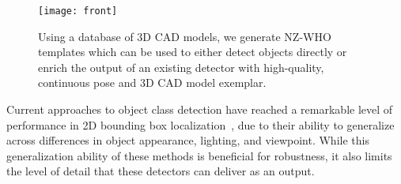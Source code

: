 \begin{figure}[t]
  \centering
  \texttt{[image: front]} %
  \caption{Using a database of 3D CAD models, we generate NZ-WHO
    templates which can be used to either detect objects directly or
    enrich the output of an existing detector with high-quality,
    continuous pose and 3D CAD model exemplar.}
  \label{fig:front}
\end{figure}
 

Current approaches to object class detection have reached a remarkable
level of performance in 2D bounding box
localization~\cite{pascal12, Felzenszwalb10, Overfeat, Krizhevsky12, Girshick14}, due to their
ability to generalize across differences in object appearance,
lighting, and viewpoint. While this generalization
ability of these methods is beneficial for robustness, it also limits
the level of detail that these detectors can deliver as an output.


